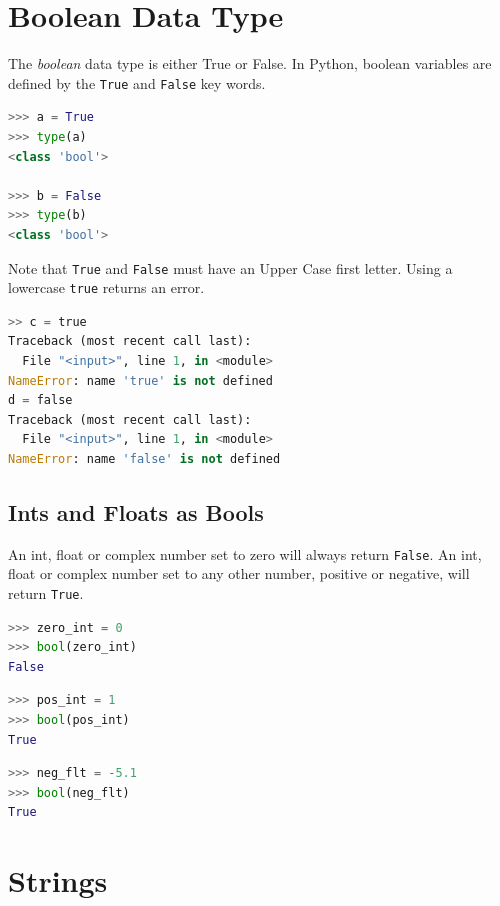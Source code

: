 \documentclass{book}
\begin{document}
    \section{Boolean Data Type}\label{boolean-data-type}

    The \emph{boolean} data type is either True or False. In Python, boolean
variables are defined by the \lstinline!True! and \lstinline!False! key
words.

\begin{lstlisting}[language=Python]
>>> a = True
>>> type(a)
<class 'bool'>

>>> b = False
>>> type(b)
<class 'bool'>
\end{lstlisting}

Note that \lstinline!True! and \lstinline!False! must have an Upper Case
first letter. Using a lowercase \lstinline!true! returns an error.

\begin{lstlisting}[language=Python]
>> c = true
Traceback (most recent call last):
  File "<input>", line 1, in <module>
NameError: name 'true' is not defined
d = false
Traceback (most recent call last):
  File "<input>", line 1, in <module>
NameError: name 'false' is not defined
\end{lstlisting}

    \subsection{Ints and Floats as Bools}\label{ints-and-floats-as-bools}

An int, float or complex number set to zero will always return
\lstinline!False!. An int, float or complex number set to any other
number, positive or negative, will return \lstinline!True!.

\begin{lstlisting}[language=Python]
>>> zero_int = 0
>>> bool(zero_int)
False
\end{lstlisting}

\begin{lstlisting}[language=Python]
>>> pos_int = 1
>>> bool(pos_int)
True
\end{lstlisting}

\begin{lstlisting}[language=Python]
>>> neg_flt = -5.1
>>> bool(neg_flt)
True
\end{lstlisting}

    \section{Strings}\label{strings}
\end{document}
